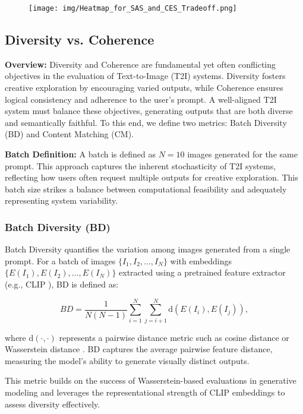 \begin{figure}[h!]
    \centering
    \texttt{[image: img/Heatmap\_for\_SAS\_and\_CES\_Tradeoff.png]}
    \caption{}
    \label{fig:}
\end{figure}

\subsection{Diversity vs. Coherence}
\label{subsec:diversity_coherence}

\textbf{Overview:} Diversity and Coherence are fundamental yet often conflicting objectives in the evaluation of Text-to-Image (T2I) systems. Diversity fosters creative exploration by encouraging varied outputs, while Coherence ensures logical consistency and adherence to the user’s prompt. A well-aligned T2I system must balance these objectives, generating outputs that are both diverse and semantically faithful. To this end, we define two metrics: Batch Diversity (BD) and Content Matching (CM).

\textbf{Batch Definition:} A batch is defined as \(N=10\) images generated for the same prompt. This approach captures the inherent stochasticity of T2I systems, reflecting how users often request multiple outputs for creative exploration. This batch size strikes a balance between computational feasibility and adequately representing system variability.

\subsubsection{Batch Diversity (BD)}
Batch Diversity quantifies the variation among images generated from a single prompt. For a batch of images \(\{I_1, I_2, \dots, I_N\}\) with embeddings \(\{E(I_1), E(I_2), \dots, E(I_N)\}\) extracted using a pretrained feature extractor (e.g., CLIP \cite{radford2021learning}), BD is defined as:

\begin{equation}
    BD = \frac{1}{N(N-1)} \sum_{i=1}^{N} \sum_{j=i+1}^{N} \text{d}(E(I_i), E(I_j)),
\end{equation}

where \(\text{d}(\cdot, \cdot)\) represents a pairwise distance metric such as cosine distance or Wasserstein distance \cite{arjovsky2017wasserstein}. BD captures the average pairwise feature distance, measuring the model’s ability to generate visually distinct outputs.

This metric builds on the success of Wasserstein-based evaluations in generative modeling \cite{arjovsky2017wasserstein} and leverages the representational strength of CLIP embeddings \cite{radford2021learning} to assess diversity effectively.

